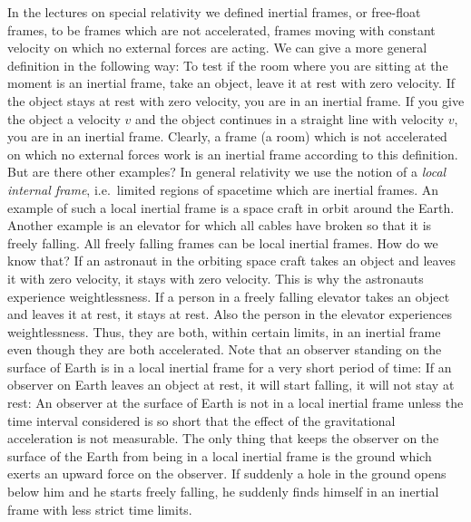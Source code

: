 {\begin{multicols}{2}
In the lectures on special relativity we defined inertial frames, or free-float frames, to be frames which are not accelerated, frames moving with constant velocity on which no external forces are acting. We can give a more general definition in the following way: To test if the room where you are sitting at the moment is an inertial frame, take an object, leave it at rest with zero velocity. If the object stays at rest with zero velocity, you are in an inertial frame. If you give the object a velocity $v$ and the object continues in a straight line with velocity $v$, you are in an inertial frame. Clearly, a frame (a room) which is not accelerated on which no external forces work is an inertial frame according to this definition. But are there other examples? In general relativity we use the notion of a {\it local internal frame}, i.e.\ limited regions of spacetime which are inertial frames. An example of such a local inertial frame is a space craft in orbit around the Earth. Another example is an elevator for which all cables have broken so that it is freely falling. All freely falling frames can be local inertial frames. How do we know that? If an astronaut in the orbiting space craft takes an object and leaves it with zero velocity, it stays with zero velocity. This is why the astronauts experience weightlessness. If a person in a freely falling elevator takes an object and leaves it at rest, it stays at rest. Also the person in the elevator experiences weightlessness. Thus, they are both, within certain limits, in an inertial frame even though they are both accelerated. Note that an observer standing on the surface of Earth is in a local inertial frame for a very short period of time: If an observer on Earth leaves an object at rest, it will start falling, it will not stay at rest: An observer at the surface of Earth is not in a local inertial frame unless the time interval considered is so short that the effect of the gravitational acceleration is not measurable. The only thing that keeps the observer on the surface of the Earth from being in a local inertial frame is the ground which exerts an upward force on the observer. If suddenly a hole in the ground opens below him and he starts freely falling, he suddenly finds himself in an inertial frame with less strict time limits.





\end{multicols}}
